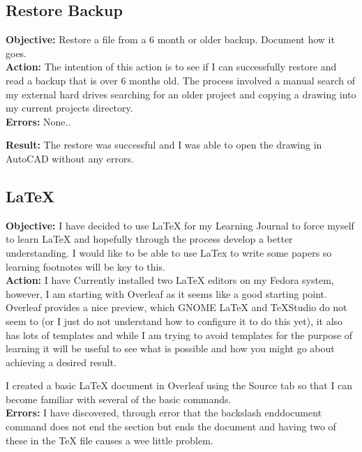 \documentclass[a4paper,12pt]{article}
\begin{document}
\subsection{Restore Backup}

\noindent \textbf{Objective:} Restore a file from a 6 month or older backup. Document how it goes.\\

\noindent \textbf{Action:}  The intention of this action is to see if I can successfully restore and read a backup that is over 6 months old. The process involved a manual search of my external hard drives searching for an older project and copying a drawing into my current projects directory.\\

\noindent \textbf{Errors:} None.. 

\noindent \textbf{Result:} The restore was successful and I was able to open the drawing in AutoCAD without any errors.

\subsection{LaTeX}

\noindent \textbf{Objective:} I have decided to use LaTeX for my Learning Journal to force myself to learn LaTeX and hopefully through the process develop a better understanding. I would like to be able to use LaTex to write some papers so learning footnotes will be key to this.\\ 

\noindent \textbf{Action:} I have Currently installed two LaTeX editors on my Fedora system, however, I am starting with Overleaf as it seems like a good starting point. Overleaf provides a nice preview, which GNOME LaTeX and TeXStudio do not seem to (or I just do not understand how to configure it to do this yet), it also has lots of templates and while I am trying to avoid templates for the purpose of learning it will be useful to see what is possible and how you might go about achieving a desired result.

I created a basic LaTeX document in Overleaf using the Source tab so that I can become familiar with several of the basic commands.\\

\noindent \textbf{Errors:} I have discovered, through error that the backslash end{document} command does not end the section but ends the document and having two of these in the TeX file causes a wee little problem.\\  
\end{document}
